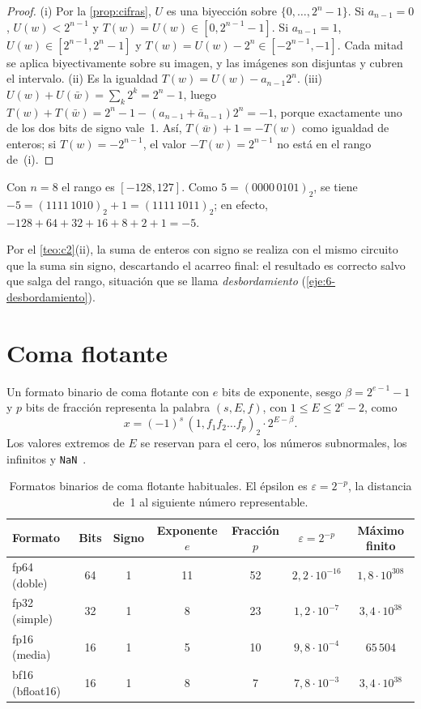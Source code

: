 \begin{proof}
(i) Por la \cref{prop:cifras}, $U$ es una biyección sobre $\{0,\dots,2^n-1\}$. Si $a_{n-1}=0$, $U(w)<2^{n-1}$ y $T(w)=U(w)\in[0,2^{n-1}-1]$. Si $a_{n-1}=1$, $U(w)\in[2^{n-1},2^n-1]$ y $T(w)=U(w)-2^n\in[-2^{n-1},-1]$. Cada mitad se aplica biyectivamente sobre su imagen, y las imágenes son disjuntas y cubren el intervalo. (ii) Es la igualdad $T(w)=U(w)-a_{n-1}2^n$. (iii) $U(w)+U(\bar w)=\sum_k2^k=2^n-1$, luego $T(w)+T(\bar w)=2^n-1-(a_{n-1}+\bar a_{n-1})2^n=-1$, porque exactamente uno de los dos bits de signo vale~1. Así, $T(\bar w)+1=-T(w)$ como igualdad de enteros; si $T(w)=-2^{n-1}$, el valor $-T(w)=2^{n-1}$ no está en el rango de~(i).
\end{proof}

\begin{ejemplo}\label{ej:c2}
Con $n=8$ el rango es $[-128,127]$. Como $5=(0000\,0101)_2$, se tiene $-5=(1111\,1010)_2+1=(1111\,1011)_2$; en efecto, $-128+64+32+16+8+2+1=-5$.
\end{ejemplo}

Por el \cref{teo:c2}(ii), la suma de enteros con signo se realiza con el mismo circuito que la suma sin signo, descartando el acarreo final: el resultado es correcto salvo que salga del rango, situación que se llama \emph{desbordamiento} (\cref{eje:6-desbordamiento}).

\section{Coma flotante}

\begin{definicion}\label{def:flotante}
Un formato binario de coma flotante con $e$ bits de exponente, sesgo $\beta=2^{e-1}-1$ y $p$ bits de fracción representa la palabra $(s,E,f)$, con $1\le E\le2^e-2$, como
\[
x=(-1)^s\,(1{,}f_1f_2\dots f_p)_2\cdot2^{E-\beta}.
\]
Los valores extremos de $E$ se reservan para el cero, los números subnormales, los infinitos y \texttt{NaN}~\cite{ieee754}.
\end{definicion}

\begin{table}[h]
\centering\small
\caption{Formatos binarios de coma flotante habituales. El épsilon es $\varepsilon=2^{-p}$, la distancia de~1 al siguiente número representable.}\label{tab:formatos}
\begin{tabular}{@{}lcccccc@{}}
\toprule
Formato & Bits & Signo & Exponente $e$ & Fracción $p$ & $\varepsilon=2^{-p}$ & Máximo finito \\
\midrule
fp64 (doble) & 64 & 1 & 11 & 52 & $2{,}2\cdot10^{-16}$ & $1{,}8\cdot10^{308}$ \\
fp32 (simple) & 32 & 1 & 8 & 23 & $1{,}2\cdot10^{-7}$ & $3{,}4\cdot10^{38}$ \\
fp16 (media) & 16 & 1 & 5 & 10 & $9{,}8\cdot10^{-4}$ & $65\,504$ \\
bf16 (bfloat16) & 16 & 1 & 8 & 7 & $7{,}8\cdot10^{-3}$ & $3{,}4\cdot10^{38}$ \\
\bottomrule
\end{tabular}
\end{table}

